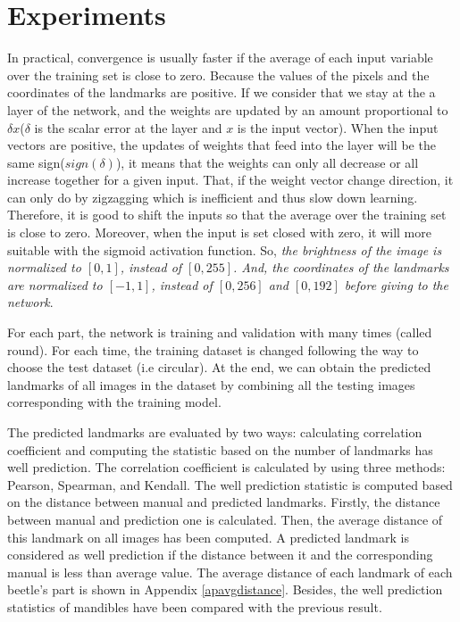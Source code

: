 \documentclass[12pt,a4paper]{article}
\begin{document}
\section{Experiments}
In practical, convergence is usually faster if the average of each input variable over the training set is close to zero. Because the values of the pixels and the coordinates of the landmarks are positive. If we consider that we stay at the a layer of the network, and the weights are updated by an amount proportional to $\delta x$($\delta$ is the scalar error at the layer and $x$ is the input vector). When the input vectors are positive, the updates of weights that feed into the layer will be the same sign($sign(\delta)$), it means that the weights can only all decrease or all increase together for a given input. That, if the weight vector change direction, it can only do by zigzagging which is inefficient and thus slow down learning. Therefore, it is good to shift the inputs so that the average over the training set is close to zero. Moreover, when the input is set closed with zero, it will more suitable with the sigmoid activation function\cite{lecun2012efficient}. So, \textit{the brightness of the image is normalized to $[0,1]$, instead of $[0,255]$. And, the coordinates of the landmarks are normalized to $[-1,1]$, instead of $[0,256]$ and $[0,192]$ before giving to the network}.

For each part, the network is training and validation with many times (called round). For each time, the training dataset is changed following the way to choose the test dataset (i.e circular). At the end, we can obtain the predicted landmarks of all images in the dataset by combining all the  testing images corresponding with the training model. 

The predicted landmarks are evaluated by two ways: calculating correlation coefficient and computing the statistic based on the number of landmarks has well prediction.
The correlation coefficient is calculated by using three methods: Pearson\cite{pallant2013spss}, Spearman\cite{myers2010research}, and Kendall\cite{kendall1938new}. The well prediction statistic is computed based on the distance between manual and predicted landmarks. Firstly, the distance between manual and prediction one is calculated. Then, the average distance of this landmark on all images has been computed. A predicted landmark is considered as well prediction if the distance between it and the corresponding manual is less than average value. The average distance of each landmark of each beetle's part is shown in Appendix \ref{apavgdistance}. Besides, the well prediction statistics of mandibles have been compared with the previous result\cite{le:hal-01571440}.
\end{document}
